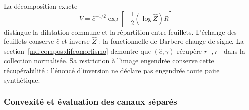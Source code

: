 La décomposition exacte
\begin{equation}
 V=\widehat c^{-1/2}
 \exp\!\left[-\frac12(\log\widehat Z)R\right]
 \label{md:hib:descomposicion-v}
\end{equation}
distingue la dilatation commune et la répartition entre feuillets. L’échange des feuillets
conserve $\widehat c$ et inverse $\widehat Z$ ; la fonctionnelle de Barbero change
de signe. La section~\ref{md:compos:difeomorfismo} démontre que
$(\widehat c,\gamma)$ récupère $r_+,r_-$ dans la collection normalisée.
Sa restriction à l’image engendrée conserve cette récupérabilité ;
l’énoncé d’inversion ne déclare pas engendrée toute paire synthétique.

\subsubsection{Convexité et évaluation des canaux séparés}
\label{md:hib:convexidad}

